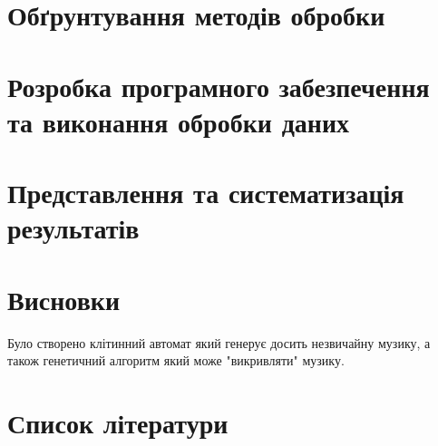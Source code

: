 \documentclass{article}
\begin{document}
    \section{Обґрунтування методів обробки}
    

    \section{Розробка програмного забезпечення та виконання обробки даних}

    
    \section{Представлення та систематизація результатів}


    \section{Висновки}
    Було створено клітинний автомат який генерує досить незвичайну музику, а також генетичний алгоритм який може "викривляти" музику.

    \section{Список літератури}
\end{document}
